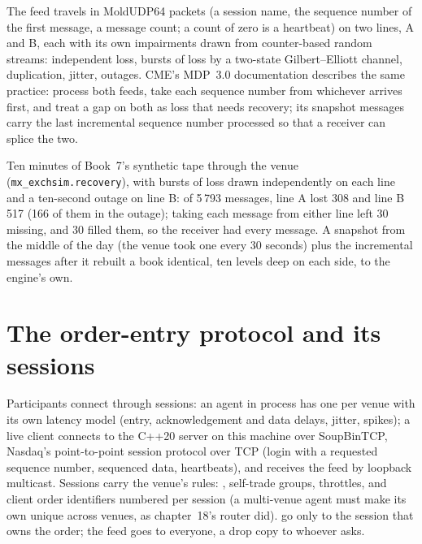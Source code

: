 The feed travels in MoldUDP64 packets (a session name, the sequence number of the first message, a message count; a count of zero is a heartbeat) on two
lines, A and B, each with its own impairments drawn from counter-based random streams: independent loss, bursts of loss by a two-state Gilbert--Elliott
channel, duplication, jitter, outages. CME's MDP~3.0 documentation describes the same practice: process both feeds, take each sequence number from
whichever arrives first, and treat a gap on both as loss that needs recovery; its snapshot messages carry the last incremental sequence number processed
so that a receiver can splice the two.

Ten minutes of Book~7's synthetic tape through the venue (\texttt{mx\_exchsim.recovery}), with bursts of loss drawn independently on each line and a
ten-second outage on line B: of 5\,793 messages, line A lost 308 and line B 517 (166 of them in the outage); taking each message from either line left 30 missing, and 30  filled them,
so the receiver had every message. A snapshot from the middle of the day (the venue took one every 30 seconds) plus the incremental messages after
it rebuilt a book identical, ten levels deep on each side, to the engine's own.

\label{lst:mx:build-a-matching-engine-and-exchange-simulator:gaps}

\section{The order-entry protocol and its sessions}

Participants connect through sessions: an agent in process has one per venue with its own latency model (entry, acknowledgement and data delays, jitter,
spikes); a live client connects to the C++20 server on this machine over SoupBinTCP, Nasdaq's point-to-point session protocol over TCP (login with a
requested sequence number, sequenced data, heartbeats), and receives the feed by loopback multicast. Sessions carry the venue's rules: , self-trade groups, throttles, and client order identifiers numbered per session (a multi-venue agent must make its own unique across venues,
as chapter~18's router did).  go only to the session that owns the order; the feed goes to everyone, a drop copy to whoever asks.

